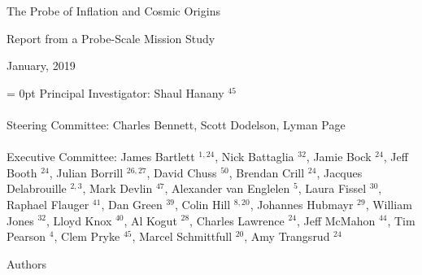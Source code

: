 \documentclass[PICOReport.tex]{subfiles}
\begin{document}

\LARGE{ \centerline{The Probe of Inflation and Cosmic Origins}}
\vspace{0.1in}
\Large{ \centerline{Report from a Probe-Scale Mission Study}}
\Large{ \centerline{January, 2019 }}

\parindent = 0pt
\normalsize{Principal Investigator: Shaul Hanany $^{45}$ }\\
\vspace{-7pt} \\
\normalsize{Steering Committee: Charles Bennett, Scott Dodelson, Lyman Page } \\
\vspace{-7pt} \\
\normalsize{Executive Committee: 
James Bartlett $^{1,24}$,
Nick Battaglia $^{32}$,
Jamie Bock $^{24}$, 
Jeff Booth $^{24}$,
Julian Borrill $^{26,27}$, 
David Chuss $^{50}$,
Brendan Crill $^{24}$, 
Jacques Delabrouille $^{2,3}$,
Mark Devlin $^{47}$, 
Alexander van Englelen $^5$,
Laura Fissel $^{30}$,
Raphael Flauger $^{41}$, 
Dan Green $^{39}$,
Colin Hill $^{8,20}$,
Johannes Hubmayr $^{29}$,
William Jones $^{32}$, 
Lloyd Knox $^{40}$, 
Al Kogut $^{28}$, 
Charles Lawrence $^{24}$, 
Jeff McMahon $^{44}$, 
Tim Pearson $^{4}$,
Clem Pryke $^{45}$, 
Marcel Schmittfull $^{20}$,
Amy Trangsrud $^{24}$ 
}
\\


\label{authorlist}

\Large  {\centerline {Authors}}
\end{document}

